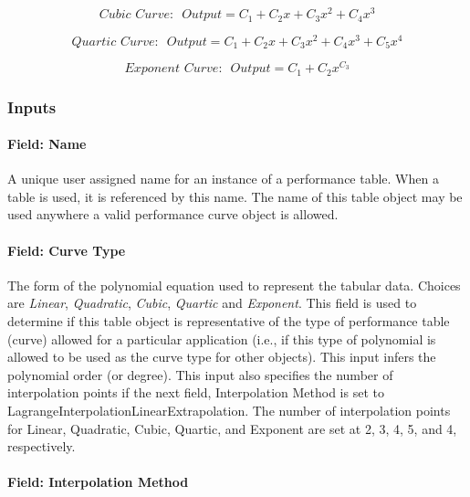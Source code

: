 \begin{equation}
Cubic\,\,Curve:\,\,\,Output = {C_1} + {C_2}x + {C_3}{x^2} + {C_4}{x^3}
\end{equation}

\begin{equation}
Quartic\,\,Curve:\,\,\,Output = {C_1} + {C_2}x + {C_3}{x^2} + {C_4}{x^3} + {C_5}{x^4}
\end{equation}

\begin{equation}
Exponent\,\,Curve:\,\,\,Output = {C_1} + {C_2}{x^{{C_3}}}
\end{equation}

\subsubsection{Inputs}\label{inputs-032}

\paragraph{Field: Name}\label{field-name-031}

A unique user assigned name for an instance of a performance table. When a table is used, it is referenced by this name. The name of this table object may be used anywhere a valid performance curve object is allowed.

\paragraph{Field: Curve Type}\label{field-curve-type}

The form of the polynomial equation used to represent the tabular data. Choices are \emph{Linear}, \emph{Quadratic}, \emph{Cubic}, \emph{Quartic} and \emph{Exponent}. This field is used to determine if this table object is representative of the type of performance table (curve) allowed for a particular application (i.e., if this type of polynomial is allowed to be used as the curve type for other objects). This input infers the polynomial order (or degree). This input also specifies the number of interpolation points if the next field, Interpolation Method is set to LagrangeInterpolationLinearExtrapolation. The number of interpolation points for Linear, Quadratic, Cubic, Quartic, and Exponent are set at 2, 3, 4, 5, and 4, respectively.

\paragraph{Field: Interpolation Method}\label{field-interpolation-method}


